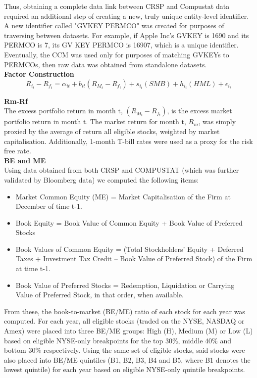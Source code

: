\documentclass[12pt]{article}
\begin{document}
\noindent Thus, obtaining a complete data link between CRSP and Compustat data required an additional step of creating a new, truly unique entity-level identifier. A new identifier called "GVKEY PERMCO" was created for purposes of traversing between datasets.
For example, if Apple Inc’s GVKEY is 1690 and its PERMCO is 7, its GV KEY PERMCO is 16907, which is a unique identifier. Eventually, the CCM was used only for purposes of matching GVKEYs to PERMCOs, then raw data was obtained from standalone datasets.\\

\noindent \textbf{Factor Construction}\\
$$
R_{i_t}-R_{f_t}=\alpha_{it}+b_{it}(R_{M_t}-R_{f_t})+s_{i_t}(SMB)+h_{i_t}(HML)+\epsilon_{i_t}
$$

\newpage

\noindent \textbf{Rm-Rf}\\
The excess portfolio return in month t, $(R_{M_t}-R_{f_t})$, is the excess market portfolio return in month t. The market return for month t, $R_m$, was simply proxied by the average of return all eligible stocks, weighted by market capitalisation. Additionally, 1-month T-bill rates were used as a proxy for the risk free rate.\\

\noindent \textbf{BE and ME}\\
Using data obtained from both CRSP and COMPUSTAT (which was further validated by Bloomberg data) we computed the following items:

\begin{itemize}	
\item{Market Common Equity (ME) = Market Capitalisation of the Firm at December of time t-1.}
\item{Book Equity = Book Value of Common Equity + Book Value of Preferred Stocks}
\item{Book Values of Common Equity  = (Total Stockholders’ Equity + Deferred Taxes + Investment Tax Credit – Book Value of Preferred Stock) of the Firm at time t-1.}
\item{Book Value of Preferred Stocks = Redemption, Liquidation or Carrying Value of Preferred Stock, in that order, when available.}
\end{itemize}

 \noindent From these, the book-to-market (BE/ME) ratio of each stock for each year was computed. For each year, all eligible stocks (traded on the NYSE, NASDAQ or Amex) were placed into three BE/ME groups: High (H), Medium (M) or Low (L) based on eligible NYSE-only breakpoints for the top 30\%, middle 40\% and bottom 30\% respectively. Using the same set of eligible stocks, said stocks were also placed into BE/ME quintiles (B1, B2, B3, B4 and B5, where B1 denotes the lowest quintile) for each year based on eligible NYSE-only quintile breakpoints.\\
 
\end{document}
